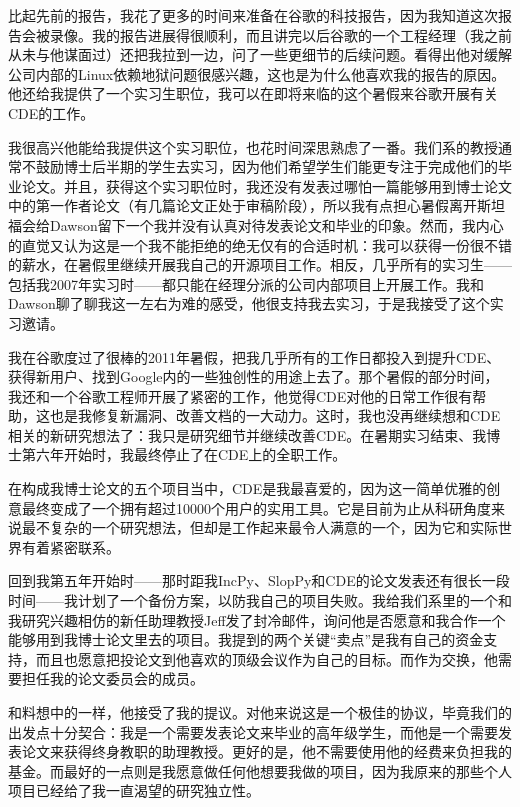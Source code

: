 \documentclass[letter,12pt]{book}
\begin{document}
\begin{CJK}{UTF8}{gbsn}
比起先前的报告，我花了更多的时间来准备在谷歌的科技报告，因为我知道这次报告会被录像。我的报告进展得很顺利，而且讲完以后谷歌的一个工程经理（我之前从未与他谋面过）还把我拉到一边，问了一些更细节的后续问题。看得出他对缓解公司内部的Linux依赖地狱问题很感兴趣，这也是为什么他喜欢我的报告的原因。他还给我提供了一个实习生职位，我可以在即将来临的这个暑假来谷歌开展有关CDE的工作。

我很高兴他能给我提供这个实习职位，也花时间深思熟虑了一番。我们系的教授通常不鼓励博士后半期的学生去实习，因为他们希望学生们能更专注于完成他们的毕业论文。并且，获得这个实习职位时，我还没有发表过哪怕一篇能够用到博士论文中的第一作者论文（有几篇论文正处于审稿阶段），所以我有点担心暑假离开斯坦福会给Dawson留下一个我并没有认真对待发表论文和毕业的印象。然而，我内心的直觉又认为这是一个我不能拒绝的绝无仅有的合适时机：我可以获得一份很不错的薪水，在暑假里继续开展我自己的开源项目工作。相反，几乎所有的实习生——包括我2007年实习时——都只能在经理分派的公司内部项目上开展工作。我和Dawson聊了聊我这一左右为难的感受，他很支持我去实习，于是我接受了这个实习邀请。

我在谷歌度过了很棒的2011年暑假，把我几乎所有的工作日都投入到提升CDE、获得新用户、找到Google内的一些独创性的用途上去了。那个暑假的部分时间，我还和一个谷歌工程师开展了紧密的工作，他觉得CDE对他的日常工作很有帮助，这也是我修复新漏洞、改善文档的一大动力。这时，我也没再继续想和CDE相关的新研究想法了：我只是研究细节并继续改善CDE。在暑期实习结束、我博士第六年开始时，我最终停止了在CDE上的全职工作。

在构成我博士论文的五个项目当中，CDE是我最喜爱的，因为这一简单优雅的创意最终变成了一个拥有超过10000个用户的实用工具。它是目前为止从科研角度来说最不复杂的一个研究想法，但却是工作起来最令人满意的一个，因为它和实际世界有着紧密联系。

\breakline

回到我第五年开始时——那时距我IncPy、SlopPy和CDE的论文发表还有很长一段时间——我计划了一个备份方案，以防我自己的项目失败。我给我们系里的一个和我研究兴趣相仿的新任助理教授Jeff发了封冷邮件，询问他是否愿意和我合作一个能够用到我博士论文里去的项目。我提到的两个关键“卖点”是我有自己的资金支持，而且也愿意把投论文到他喜欢的顶级会议作为自己的目标。而作为交换，他需要担任我的论文委员会的成员。

和料想中的一样，他接受了我的提议。对他来说这是一个极佳的协议，毕竟我们的出发点十分契合：我是一个需要发表论文来毕业的高年级学生，而他是一个需要发表论文来获得终身教职的助理教授。更好的是，他不需要使用他的经费来负担我的基金。而最好的一点则是我愿意做任何他想要我做的项目，因为我原来的那些个人项目已经给了我一直渴望的研究独立性。


\end{CJK}
\end{document}
